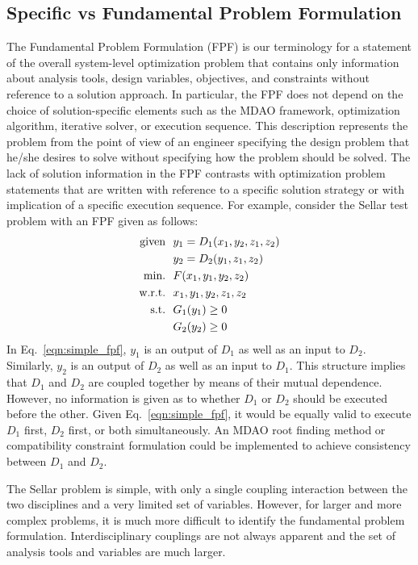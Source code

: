 \subsection{Specific vs Fundamental Problem Formulation }
	\label{s:specific vs fundamental}
    The Fundamental Problem Formulation (FPF) is our terminology for a statement of the overall system-level optimization problem that contains only  information about analysis tools, design variables, objectives, and constraints without reference to a solution approach. 
In particular, the FPF does not depend on the choice of solution-specific elements such as the MDAO framework, optimization algorithm, iterative solver, or execution sequence. 
This description represents  the problem from the point of view of an engineer specifying the design problem that he/she desires to solve without specifying how the problem should be solved. 
The lack of solution information in the FPF contrasts with optimization problem statements that are written with reference to a specific solution strategy or with implication of a specific execution sequence. 
For example, consider the Sellar test problem \cite{AIAA:sellar} with an FPF given as follows:
    \begin{align}
        \textrm{given} & \ \ y_1 = D_1(x_1,y_2,z_1,z_2) \notag
        \\      & \ \ y_2 = D_2(y_1,z_1,z_2) \notag
        \\\textrm{min.} &\ \ F(x_1,y_1,y_2,z_2) \notag
        \\\textrm{w.r.t.} & \ \ x_1,y_1,y_2,z_1,z_2 \notag
        \\\textrm{s.t.} & \ \ G_1(y_1) \geq 0 \notag
        \\     & \ \ G_2(y_2) \geq 0
        \label{eqn:simple_fpf}
    \end{align}
    In Eq.~\ref{eqn:simple_fpf}, $y_1$ is an output of $D_1$ as well as an input 
    to $D_2$. Similarly, $y_2$ is an output of $D_2$ as well as an input 
    to $D_1$. This structure implies that $D_1$ and $D_2$ are coupled together by means 
    of their mutual dependence. However, no information is given as to whether
    $D_1$ or $D_2$ should be executed before the other. Given Eq.~\ref{eqn:simple_fpf}, 
    it would be equally valid to execute $D_1$ first, $D_2$ first, or both simultaneously. 
An MDAO root finding method or compatibility constraint formulation could be implemented to achieve consistency between $D_1$ and $D_2$.
    
    The Sellar problem is simple, with only a single coupling interaction 
    between the two disciplines and a very limited set of variables. 
 However, for larger and more complex problems, 
    it is much more difficult to identify the fundamental problem formulation. Interdisciplinary 
    couplings are not always apparent and the set of analysis tools and variables are 
    much larger. 

